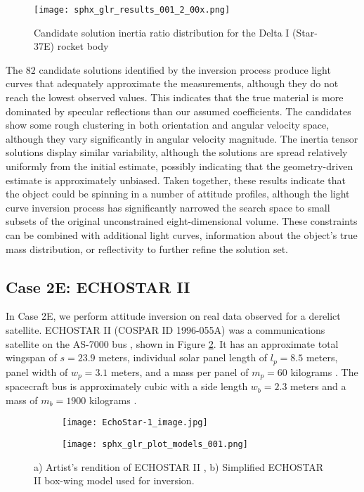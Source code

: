 \documentclass[a4paper,twocolumn]{spaceDebrisC} %
\newcommand{\figsmall}[0]{0.3\textwidth}
\begin{document}
\begin{figure}[H]
  \centering
  \texttt{[image: sphx\_glr\_results\_001\_2\_00x.png]}
  \caption{Candidate solution inertia ratio distribution for the Delta I (Star-37E) rocket body}
  \label{fig:case2_i}
\end{figure}

The $82$ candidate solutions identified by the inversion process produce light curves that adequately approximate the measurements, although they do not reach the lowest observed values. This indicates that the true material is more dominated by specular reflections than our assumed coefficients. The candidates show some rough clustering in both orientation and angular velocity space, although they vary significantly in angular velocity magnitude. The inertia tensor solutions display similar variability, although the solutions are spread relatively uniformly from the initial estimate, possibly indicating that the geometry-driven estimate is approximately unbiased. Taken together, these results indicate that the object could be spinning in a number of attitude profiles, although the light curve inversion process has significantly narrowed the search space to small subsets of the original unconstrained eight-dimensional volume. These constraints can be combined with additional light curves,  information about the object's true mass distribution, or reflectivity to further refine the solution set.

\subsection{Case 2E: ECHOSTAR II}

In Case 2E, we perform attitude inversion on real data observed for a derelict satellite. ECHOSTAR II (COSPAR ID 1996-055A) was a communications satellite on the AS-7000 bus \cite{as7000_astronautix}, shown in Figure \ref{fig:echostar1}. It has an approximate total wingspan of $s = 23.9$ meters, individual solar panel length of $l_p=8.5$ meters, panel width of $w_p=3.1$ meters, and a mass per panel of $m_p = 60$ kilograms \cite{earl2015}. The spacecraft bus is approximately cubic with a side length $w_b=2.3$ meters and a mass of $m_b = 1900$ kilograms \cite{earl2015}.

\begin{figure}[H]
  \centering
  \begin{subfigure}[b]{0.35\textwidth}
    \centering
    \texttt{[image: EchoStar-1\_image.jpg]}
    \caption{}
    \label{fig:echostar1}
  \end{subfigure}
  \hfill
  \begin{subfigure}[b]{0.35\textwidth}
    \centering
    \texttt{[image: sphx\_glr\_plot\_models\_001.png]}
    \caption{}
    \label{fig:echostar1_simple}
  \end{subfigure}
  \caption{a) Artist's rendition of ECHOSTAR II \cite{as7000_astronautix}, b) Simplified ECHOSTAR II box-wing model used for inversion.}
  \label{fig:echostar}
\end{figure}
\end{document}
